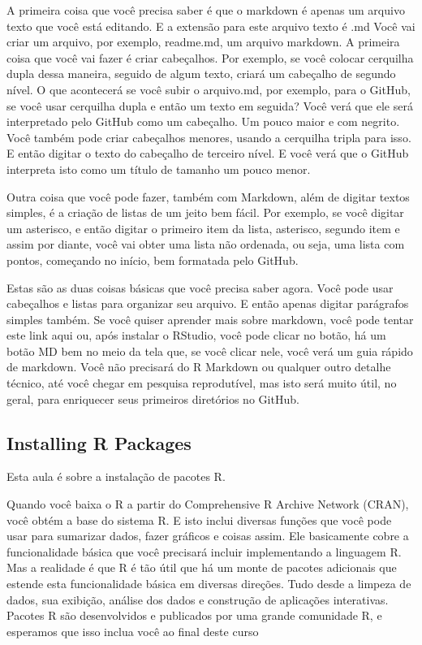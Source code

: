 A primeira coisa que você precisa saber é que o markdown é apenas um arquivo texto que você está editando. E a extensão para este arquivo texto é .md Você vai criar um arquivo, por exemplo, readme.md, um arquivo markdown. A primeira coisa que você vai fazer é criar cabeçalhos. Por exemplo, se você colocar cerquilha dupla dessa maneira, seguido de algum texto, criará um cabeçalho de segundo nível. O que acontecerá se você subir o arquivo.md, por exemplo, para o GitHub, se você usar cerquilha dupla e então um texto em seguida? Você verá que ele será interpretado pelo GitHub como um cabeçalho. Um pouco maior e com negrito. Você também pode criar cabeçalhos menores, usando a cerquilha tripla para isso. E então digitar o texto do cabeçalho de terceiro nível. E você verá que o GitHub interpreta isto como um título de tamanho um pouco menor. 

Outra coisa que você pode fazer, também com Markdown, além de digitar textos simples, é a criação de listas de um jeito bem fácil. Por exemplo, se você digitar um asterisco, e então digitar  o primeiro item da lista, asterisco, segundo item e assim por diante, você vai obter uma lista não ordenada, ou seja, uma lista com pontos, começando no início, bem formatada pelo GitHub. 

Estas são as duas coisas básicas que você precisa saber agora. Você pode usar cabeçalhos e listas para organizar seu arquivo. E então apenas digitar parágrafos simples também. Se você quiser aprender mais sobre markdown, você pode tentar este link aqui ou, após instalar o RStudio, você pode clicar no botão, há um botão MD bem no meio da tela que, se você clicar nele, você verá um guia rápido de markdown. Você não precisará do R Markdown ou qualquer outro detalhe técnico, até você chegar em pesquisa reprodutível, mas isto será muito útil, no geral, para enriquecer seus primeiros diretórios no GitHub. 


\subsection{Installing R Packages}

Esta aula é sobre a instalação de pacotes R.

Quando você baixa o R a partir do Comprehensive R Archive Network (CRAN), você obtém a base do sistema R. E isto inclui diversas funções que você pode usar para sumarizar dados, fazer gráficos e coisas assim. Ele basicamente cobre a funcionalidade básica que você precisará incluir implementando a linguagem R. Mas a realidade é que R é tão útil que há um monte  de pacotes adicionais que estende esta funcionalidade básica em diversas direções. Tudo desde a limpeza de dados, sua exibição, análise dos dados e construção de aplicações interativas. Pacotes R são desenvolvidos e publicados por uma grande comunidade R, e esperamos que isso inclua você ao final deste curso 

